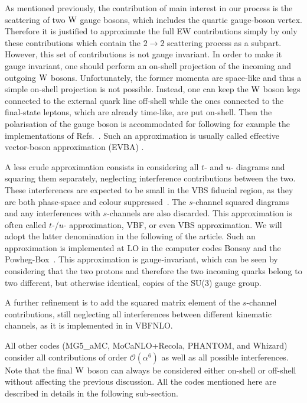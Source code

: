 As mentioned previously, the contribution of main interest in our process is
the scattering of two $\text{W}$ gauge bosons, which includes the quartic gauge-boson vertex.
Therefore it is justified to approximate the full EW contributions simply by only these contributions which contain the $2\rightarrow 2$ scattering process as a subpart.
However, this set of contributions is not gauge invariant. In order to make it gauge invariant, one 
should perform an on-shell projection of the incoming and outgoing $\text{W}$ bosons.
Unfortunately, the former momenta are space-like and thus a simple on-shell projection is not possible.
Instead, one can keep the $\text{W}$ boson legs connected to the external quark line off-shell while the ones connected to the final-state leptons, which are already time-like, are put on-shell.
Then the polarisation of the gauge boson is accommodated for following for example the implementations of Refs.~\cite{Kuss:1995yv,Accomando:2006hq}.
Such an approximation is usually called effective vector-boson approximation (EVBA) \cite{Dawson:1984gx,Duncan:1985vj,Cahn:1983ip}.

A less crude approximation consists in considering all $t$- and $u$- diagrams and squaring them separately, neglecting interference contributions between the two.
These interferences are expected to be small in the VBS fiducial region, as they are both phase-space and colour suppressed~\cite{Oleari:2003tc}.
The $s$-channel squared diagrams and any interferences with $s$-channels are also discarded.
This approximation is often called $t$-/$u$- approximation, VBF, or even VBS approximation.
We will adopt the latter denomination in the following of the article.
Such an approximation is implemented at LO in the computer codes {\sc Bonsay}  and the {\sc Powheg-Box}~\cite{Alioli:2010xd}.
This approximation is gauge-invariant, which can be seen by considering that the two protons and therefore the two incoming quarks belong to two different, but otherwise identical, copies of the SU(3) gauge group.

A further refinement is to add the squared matrix element of the $s$-channel contributions, still neglecting 
all interferences between different kinematic channels, as it is implemented in in {\sc VBFNLO}.

All other codes ({\sc MG5\_aMC}, {\sc MoCaNLO+Recola}, {\sc PHANTOM}, and {\sc Whizard})  consider all contributions of order $\mathcal{O}{\left(\alpha^{6}\right)}$ as well as all possible interferences.
Note that the final $\text{W}$ boson can always be considered either on-shell or off-shell without affecting the previous discussion.
All the codes mentioned here are described in details in the following sub-section.

